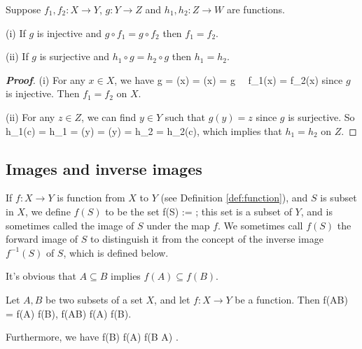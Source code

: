 \begin{proposition}
Suppose $f_1,f_2:X\to Y$, $g :Y\to Z$ and $h_1,h_2:Z\to W$ are functions.
\ben
\item [(i)] If $g$ is injective and $g\circ f_1 = g\circ f_2$ then $f_1= f_2$.
\item [(ii)] If $g$ is surjective and $h_1\circ g = h_2\circ g$ then $h_1= h_2$.
\een
\end{proposition}


\begin{proof}[\bf Proof]
\ben
\item [(i)] For any $x\in X$, we have
\be
g = (x) =  (x) = g \ \ra\ f_1(x) = f_2(x)
\ee
since $g$ is injective. Then $f_1 = f_2$ on $X$.

\item [(ii)] For any $z\in Z$, we can find $y \in Y$ such that $g(y) =z$ since $g$ is surjective. So
\be
h_1(c) = h_1 = (y) = (y) = h_2 = h_2(c),
\ee
which implies that $h_1 = h_2$ on $Z$.
\een
\end{proof}



\subsection{Images and inverse images}

\begin{definition}\label{def:image_set}
If $f:X\to Y$ is function from $X$ to $Y$ (see Definition \ref{def:function}), and $S$ is subset in $X$, we define $f(S)$ to be the set \be f(S) := ; \ee this set is a subset of
$Y$, and is sometimes called the image of $S$ under the map $f$. We sometimes call $f(S)$ the forward image of $S$ to distinguish it from the concept of the inverse image $f^{-1}(S)$ of $S$, which
is defined below.
\end{definition}

\begin{remark}
It's obvious that $A\subseteq B$ implies $f(A)\subseteq f(B)$.
\end{remark}

\begin{proposition}
Let $A,B$ be two subsets of a set $X$, and let $f:X\to Y$ be a function. Then
\be
f(A\cup B) = f(A) \cup f(B),\qquad
f(A\cap B) \subseteq f(A) \cap f(B).%
\ee


Furthermore, we have
\be
f(B) \bs f(A) \subseteq f(B \bs A) .
\ee
\end{proposition}

